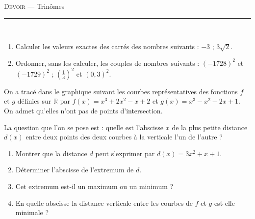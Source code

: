 \documentclass[11pt]{article}
\begin{document}
\begin{center}
  \textsc{Devoir} --- Trinômes
\end{center}
\hrule

\begin{exercice}~
  \begin{enumerate}
    \item Calculer les valeurs exactes des carrés des nombres suivants :
      $-3$ ;
      $3\sqrt2$.
    \item Ordonner, sans les calculer, les couples de nombres suivants :
      $(-1728)^2$ et $(-1729)^2$ ;
      $(\frac{1}{3})^2$ et $(0,3)^2$.
  \end{enumerate}
\end{exercice}

\begin{exercice}On a tracé dans le graphique suivant les courbes représentatives des fonctions $f$ et $g$ définies sur $\mathbb R$ par $f(x)=x^3+2x^2-x+2$ et $g(x)=x^3-x^2-2x+1$. On admet qu'elles n'ont pas de points d'intersection.

  La question que l'on se pose est : quelle est l'abscisse $x$ de la  plus petite distance $d(x)$ entre deux points des deux courbes à la verticale l'un de l'autre ?

  \begin{center}
  \end{center}

  \begin{enumerate}
    \item Montrer que la distance $d$ peut s'exprimer par $d(x)=3x^2+x+1$.
    \item Déterminer l'abscisse de l'extremum de $d$.
    \item Cet extremum est-il un maximum ou un minimum ?
    \item En quelle abscisse la distance verticale entre les courbes de $f$ et $g$ est-elle minimale ?
  \end{enumerate}
\end{exercice}
\end{document}
